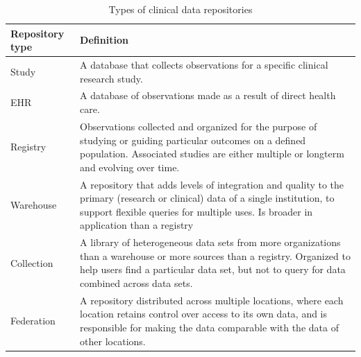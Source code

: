 \documentclass[mim_thesis.tex]{subfiles}
\begin{document}
\begin{table}[H]
\centering
	\caption{Types of clinical data repositories \citep{wade2014traits}}
	\label{tab:types_cd_repo}
\begin{tabular}{p{3.5cm} p{10.5cm}}
		\toprule[2pt]
		\textbf{Repository type}    & \textbf{Definition}  \\
		\midrule[2pt]
		Study  &  A database that collects observations for a specific clinical research study.\\
		\midrule
		EHR & A database of observations made as a result of direct health care.\\
		\midrule
		Registry & Observations collected and organized for the purpose of studying or guiding particular outcomes on a defined population.
Associated studies are either multiple or longterm and evolving over time. \\
        \midrule
        Warehouse  & A repository that adds levels of integration and quality to the primary (research or clinical) data of a single institution, to support
flexible queries for multiple uses. Is broader in application than a registry \\
		\midrule
		Collection & A library of heterogeneous data sets from more organizations than a warehouse or more sources than a registry. Organized to
help users find a particular data set, but not to query for data combined across data sets.\\
		\midrule
		Federation & A repository distributed across multiple locations, where each location retains control over access to its own data, and is
responsible for making the data comparable with the data of other locations.\\
		\bottomrule[2pt]
\end{tabular}
\end{table}
\end{document}
